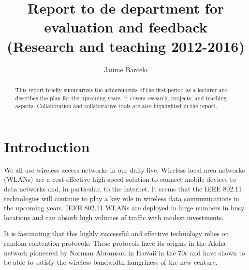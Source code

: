 \documentclass[a4paper,twocolumns]{article}%
\begin{document}
\title{Report to de department for evaluation and feedback \\ (Research and teaching 2012-2016) }

\author{Jaume Barcelo}


\date{}

\maketitle

\begin{abstract}
This report briefly summarizes the achievements of the first period as a lecturer and describes the plan for the upcoming years.
It covers research, projects, and teaching aspects.
Collaboration and collaborative tools are also highlighted in the report.



\end{abstract}

\tableofcontents

\clearpage


\section{Introduction}

We all use wireless access networks in our daily live.
Wireless local area networks (WLANs) are a cost-effective high-speed solution to connect mobile devices to data networks and, in particular, to the Internet.
It seems that the IEEE 802.11 technologies will continue to play a key role in wireless data communications in the upcoming years.
IEEE 802.11 WLANs are deployed in large numbers in busy locations and can absorb high volumes of traffic with modest investments.

It is fascinating that this highly successful and effective technology relies on random contention protocols.
These protocols have its origins in the Aloha network pioneered by Norman Abramson in Hawaii in the 70s and have shown to be able to satisfy the wireless bandwidth hungriness of the new century.
\end{document}
